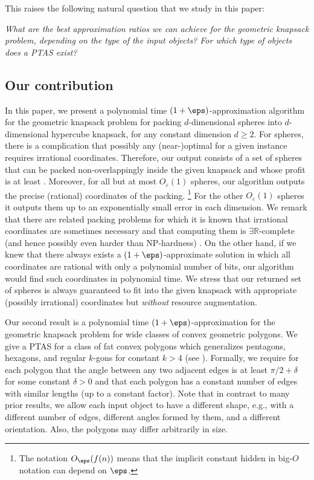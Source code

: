 This raises the following natural question that we study in this paper:
\begin{center}
\emph{What are the best approximation ratios we can achieve for the
geometric knapsack problem, depending on the type of the input objects?
For which type of objects does a \textsf{PTAS} exist?}
\par\end{center}

\subsection{Our contribution}

In this paper, we present a polynomial time $(1+\eps)$-approximation algorithm for the geometric knapsack problem for packing  
$d$-dimensional spheres into $d$-dimensional hypercube knapsack, for any constant dimension $d \ge 2$. For spheres,
there is a complication that possibly any (near-)optimal
 for a given instance requires irrational coordinates. Therefore,
our output consists of a set of spheres that can be packed non-overlappingly
inside the given knapsack and whose profit is at least .
Moreover, for all but at most $O_{\varepsilon}(1)$ spheres, our algorithm
outputs the precise (rational) coordinates of the packing. \footnote{The notation $O_{\eps}(f(n))$ means that the implicit constant hidden in big-$O$ notation can depend on $\eps$.}
For the other $O_{\varepsilon}(1)$
spheres it outputs them up to an exponentially small error in each
dimension. We remark that there are related packing problems for which
it is known that irrational coordinates are sometimes necessary and
that computing them is $\exists\mathbb{R}$-complete (and hence possibly
even harder than \textsf{NP}-hardness) \cite{abrahamsen2020framework}.
On the other hand, if we knew that there always exists a $(1+\eps)$-approximate
solution in which all coordinates are rational with only a polynomial
number of bits, our algorithm would find such coordinates in polynomial
time. We stress that our returned set of spheres is always guaranteed
to fit into the given knapsack with appropriate (possibly irrational)
coordinates but \emph{without} resource augmentation.

Our second result is a polynomial time $(1+\eps)$-approximation
 for the geometric knapsack problem for wide classes of
convex geometric polygons. We give a \textsf{PTAS} for a class of
fat convex polygons which generalizes pentagons, hexagons, and regular
$k$-gons for constant $k>4$ (see ). Formally, we require
for each polygon that the angle between any two adjacent edges is
at least $\pi/2+\delta$ for some constant $\delta>0$ and that each
polygon has a constant number of edges with similar lengths (up to
a constant factor). Note that in contrast to many prior results, we
allow each input object to have a different shape, e.g., with a different
number of edges, different angles formed by them, and a different
orientation. Also, the polygons may differ arbitrarily in size.

